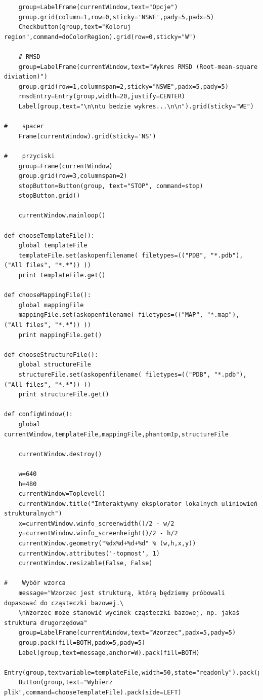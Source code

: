 \documentclass[licencjacka]{pracamgr}
\begin{document}
\begin{lstlisting}
    group=LabelFrame(currentWindow,text="Opcje")
    group.grid(column=1,row=0,sticky='NSWE',pady=5,padx=5)
    Checkbutton(group,text="Koloruj region",command=doColorRegion).grid(row=0,sticky="W")
    
    # RMSD
    group=LabelFrame(currentWindow,text="Wykres RMSD (Root-mean-square diviation)")
    group.grid(row=1,columnspan=2,sticky="NSWE",padx=5,pady=5)
    rmsdEntry=Entry(group,width=20,justify=CENTER)
    Label(group,text="\n\ntu bedzie wykres...\n\n").grid(sticky="WE")
    
#    spacer
    Frame(currentWindow).grid(sticky='NS')
    
#    przyciski
    group=Frame(currentWindow)
    group.grid(row=3,columnspan=2)
    stopButton=Button(group, text="STOP", command=stop)
    stopButton.grid()
    
    currentWindow.mainloop()

def chooseTemplateFile():
    global templateFile
    templateFile.set(askopenfilename( filetypes=(("PDB", "*.pdb"), ("All files", "*.*")) ))
    print templateFile.get()

def chooseMappingFile():
    global mappingFile
    mappingFile.set(askopenfilename( filetypes=(("MAP", "*.map"), ("All files", "*.*")) ))
    print mappingFile.get()
    
def chooseStructureFile():
    global structureFile
    structureFile.set(askopenfilename( filetypes=(("PDB", "*.pdb"), ("All files", "*.*")) ))
    print structureFile.get()
    
def configWindow():
    global currentWindow,templateFile,mappingFile,phantomIp,structureFile

    currentWindow.destroy()

    w=640
    h=480
    currentWindow=Toplevel()
    currentWindow.title("Interaktywny eksplorator lokalnych uliniowień strukturalnych")
    x=currentWindow.winfo_screenwidth()/2 - w/2
    y=currentWindow.winfo_screenheight()/2 - h/2
    currentWindow.geometry("%dx%d+%d+%d" % (w,h,x,y))
    currentWindow.attributes('-topmost', 1)
    currentWindow.resizable(False, False)

#    Wybór wzorca
    message="Wzorzec jest strukturą, którą będziemy próbowali dopasować do cząsteczki bazowej.\
    \nWzorzec może stanowić wycinek cząsteczki bazowej, np. jakaś struktura drugorzędowa"
    group=LabelFrame(currentWindow,text="Wzorzec",padx=5,pady=5)
    group.pack(fill=BOTH,padx=5,pady=5)
    Label(group,text=message,anchor=W).pack(fill=BOTH)
    Entry(group,textvariable=templateFile,width=50,state="readonly").pack(pady=5,side=LEFT)
    Button(group,text="Wybierz plik",command=chooseTemplateFile).pack(side=LEFT)
    

\end{lstlisting}
\end{document}
